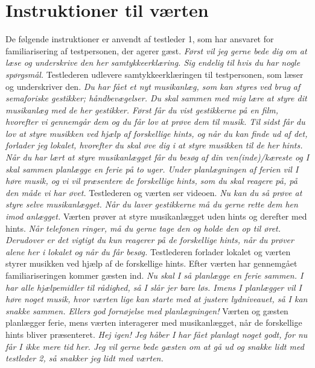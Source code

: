 \chapter{Instruktioner til værten}
\label{app:InstruktionerVaert}
%
De følgende instruktioner er anvendt af testleder 1, som har ansvaret for familiarisering af testpersonen, der agerer gæst. \blankline
%
\textit{Først vil jeg gerne bede dig om at læse og underskrive den her samtykkeerklæring. Sig endelig til hvis du har nogle spørgsmål.}\blankline
%
Testlederen udlevere samtykkeerklæringen til testpersonen, som læser og underskriver den. \blankline
%
\textit{Du har fået et nyt musikanlæg, som kan styres ved brug af semaforiske gestikker; håndbevægelser. Du skal sammen med mig lære at styre dit musikanlæg med de her gestikker. Først får du vist gestikkerne på en film, hvorefter vi gennemgår dem og du får lov at prøve dem til musik. Til sidst får du lov at styre musikken ved hjælp af forskellige hints, og når du kan finde ud af det, forlader jeg lokalet, hvorefter du skal øve dig i at styre musikken til de her hints. Når du har lært at styre musikanlægget får du besøg af din ven(inde)/kæreste og I skal sammen planlægge en ferie på to uger. Under planlægningen af ferien vil I høre musik, og vi vil præsentere de forskellige hints, som du skal reagere på, på den måde vi har øvet.}\blankline
%
Testlederen og værten ser videoen.\blankline
%
\textit{Nu kan du så prøve at styre selve musikanlægget. Når du laver gestikkerne må du gerne rette dem hen imod anlægget.}\blankline
%
Værten prøver at styre musikanlægget uden hints og derefter med hints. \blankline
%
\textit{Når telefonen ringer, må du gerne tage den og holde den op til øret. Derudover er det vigtigt du kun reagerer på de forskellige hints, når du prøver alene her i lokalet og når du får besøg.}\blankline
%
Testlederen forlader lokalet og værten styrer musikken ved hjælp af de forskellige hints. Efter værten har gennemgået familiariseringen kommer gæsten ind. \blankline
%
\textit{Nu skal I så planlægge en ferie sammen. I har alle hjælpemidler til rådighed, så I slår jer bare løs. Imens I planlægger vil I høre noget musik, hvor værten lige kan starte med at justere lydniveauet, så I kan snakke sammen. Ellers god fornøjelse med planlægningen!}\blankline
%
Værten og gæsten planlægger ferie, mens værten interagerer med musikanlægget, når de forskellige hints bliver præsenteret.\blankline
%
\textit{Hej igen! Jeg håber I har fået planlagt noget godt, for nu får I ikke mere tid her. Jeg vil gerne bede gæsten om at gå ud og snakke lidt med testleder 2, så snakker jeg lidt med værten.}
